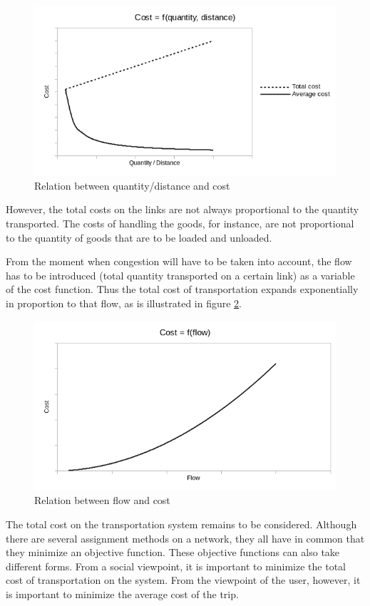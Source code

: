 \begin{figure}[htbp]
\centerline{\includegraphics[width=12cm]{f2_1.png}}
\caption{\label{f2_1} Relation between quantity/distance and cost}
\end{figure}

However, the total costs on the links are not always proportional to the
quantity transported.  The costs of handling the goods, for instance, are not
proportional to the quantity of goods that are to be loaded and unloaded.


From the moment when congestion will have to be taken into account, the flow has
to be introduced (total quantity transported on a certain link) as a variable of
the cost function.  Thus the total cost of transportation expands exponentially
in proportion to that flow, as is illustrated in figure \ref{f2_2}.

\begin{figure}[htbp]
\centerline{\includegraphics[width=12cm]{f2_2.png}}
\caption{\label{f2_2} Relation between flow and cost}
\end{figure}

The total cost on the transportation system remains to be considered.
Although there are several assignment methods on a network, they all have in
common that they minimize an objective function.  These objective functions can
also take different forms.  From a social viewpoint, it is important to minimize
the total cost of transportation on the system.  From the viewpoint of the user,
however, it is important to minimize the average cost of the trip.

